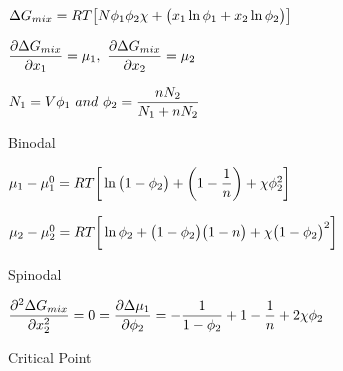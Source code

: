 \begin{bigmdframed}


\begin{listone}
    
    \item $\iipf\gibbs_{mix} = \gasconst\Temp\big[\nummoles\fhmolefrac{1}\fhmolefrac{2}\fhparam + \big(\specfrac{1}\ln\fhmolefrac{1} + \specfrac{2}\ln\fhmolefrac{2}\big)\big]$ 
    
    \item  $\dfrac{\partial\iipf\gibbs_{mix}}{\partial\specfrac{1}} = \chempot_{1} ,~\dfrac{\partial\iipf\gibbs_{mix}}{\partial\specfrac{2}} = \chempot_{2}$
    
    \item $\massspecflux{1} = \vol\fhmolefrac{1}~and~\fhmolefrac{2} = \dfrac{n\massspecflux{2}}{\massspecflux{1} + n\massspecflux{2}}$   %
    
    \item Binodal
    
    \begin{listtwo}
    
    	\item $\chempot_{1} - \chempot_{1}^{\init} = \gasconst\Temp\bigg[\ln\big(1-\fhmolefrac{2}\big)+\bigg(1-\dfrac{1}{n}\bigg)+\fhparam\fhmolefrac{2}^2\bigg]$
    
    	\item $\chempot_{2} - \chempot_{2}^{\init} = \gasconst\Temp\bigg[\ln\fhmolefrac{2}+\big(1-\fhmolefrac{2}\big)\big(1-n\big)+\fhparam\big(1-\fhmolefrac{2}\big)^2\bigg]$
    
    \end{listtwo}
        
    \item Spinodal
    
    \begin{listtwo}
    
    	\item $\dfrac{\partial^2\iipf\gibbs_{mix}}{\partial\specfrac{2}^2} = 0 = \dfrac{\partial\iipf\chempot_{1}}{\partial\fhmolefrac{2}} = -\dfrac{1}{1-\fhmolefrac{2}}+1-\dfrac{1}{n}+2\fhparam\fhmolefrac{2}$
    
    \end{listtwo}
    
    \item Critical Point
    
    \begin{listtwo}
    

\end{listtwo}
\end{listone}
\end{bigmdframed}
